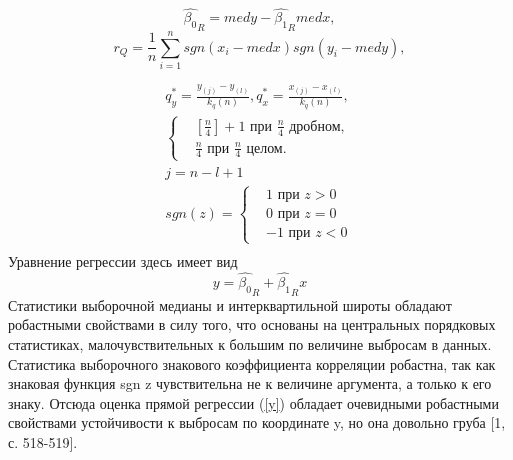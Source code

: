     \begin{equation}
        \hat{\beta_{0}}_{R} = med y - \hat{\beta_{1}}_{R} med x,
        \label{b_0R}
    \end{equation}
    \begin{equation}
        r_{Q} = \frac{1}{n}\sum_{i=1}^{n}{sgn(x_{i} - med x)sgn(y_{i} - med y)},
        \label{r_Q}
    \end{equation}
    \begin{multline}
        \\\\
        q^{*}_{y} = \frac{y_{(j)} -y_{(l)}}{k_{q}(n)}, 
        q^{*}_{x} = \frac{x_{(j)} - x_{(l)}}{k_{q}(n)}, \\ 
        \begin{cases}
             & [\frac{n}{4}] + 1 \text{ при } \frac{n}{4} \text{ дробном, } \\ 
             & \frac{n}{4} \text{ при } \frac{n}{4} \text{ целом. }
        \end{cases}\\
        j = n - l + 1\\
        sgn(z) = \begin{cases}
                    & 1 \text{ при } z > 0 \\ 
                    & 0 \text{ при } z = 0 \\
                    & -1 \text{ при } z < 0
                 \end{cases}\\
        \label{q*}        
    \end{multline}
    Уравнение регрессии здесь имеет вид 
    \begin{equation}
        y = \hat{\beta_{0}}_{R} +  \hat{\beta_{1}}_{R}x
        \label{y}
    \end{equation}
    Статистики выборочной медианы и интерквартильной широты обладают робастными свойствами в силу того, что основаны на центральных порядковых статистиках, малочувствительных к большим по величине выбросам в данных. Статистика выборочного знакового коэффициента корреляции робастна, так как знаковая функция sgn z чувствительна не к величине аргумента, а только к его знаку. Отсюда оценка прямой регрессии (\ref{y}) обладает очевидными робастными свойствами устойчивости к выбросам по координате y, но она довольно груба [1, с. 518-519].